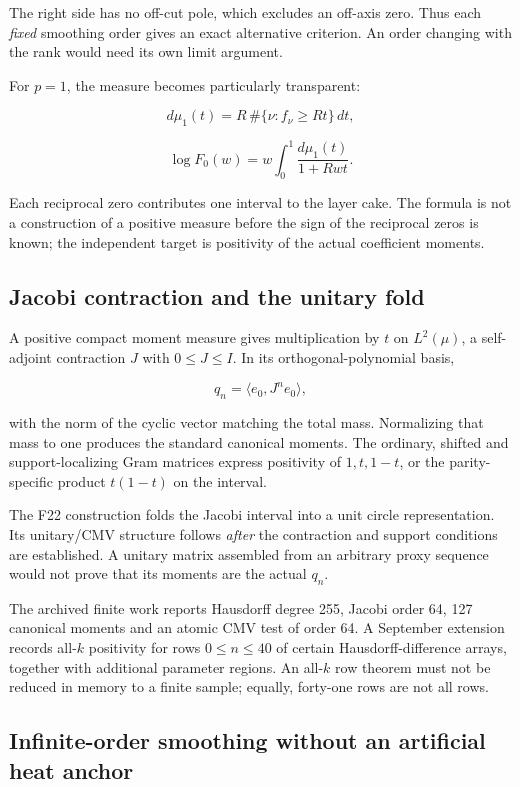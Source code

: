 \documentclass[
  10pt,
  a4paper,
  10pt,
  oneside,
  openany]{book}
\begin{document}
The right side has no off-cut pole, which excludes an off-axis zero.
Thus each \emph{fixed} smoothing order gives an exact alternative
criterion. An order changing with the rank would need its own limit
argument.

For \(p=1\), the measure becomes particularly transparent:

\[
 d\mu_1(t)=R\,\#\{\nu:f_\nu\ge Rt\}\,dt,
\]

\[
 \log F_0(w)=w\int_0^1\frac{d\mu_1(t)}{1+Rwt}.
 \tag{33.3}\label{eq:33.3}
\]

Each reciprocal zero contributes one interval to the layer cake. The
formula is not a construction of a positive measure before the sign of
the reciprocal zeros is known; the independent target is positivity of
the actual coefficient moments.

\subsection{Jacobi contraction and the unitary
fold}\label{jacobi-contraction-and-the-unitary-fold}

A positive compact moment measure gives multiplication by \(t\) on
\(L^2(\mu)\), a self-adjoint contraction \(J\) with \(0\le J\le I\). In
its orthogonal-polynomial basis,

\[
 q_n=\langle e_0,J^ne_0\rangle,
\]

with the norm of the cyclic vector matching the total mass. Normalizing
that mass to one produces the standard canonical moments. The ordinary,
shifted and support-localizing Gram matrices express positivity of
\(1,t,1-t\), or the parity-specific product \(t(1-t)\) on the interval.

The F22 construction folds the Jacobi interval into a unit circle
representation. Its unitary/CMV structure follows \emph{after} the
contraction and support conditions are established. A unitary matrix
assembled from an arbitrary proxy sequence would not prove that its
moments are the actual \(q_n\).

The archived finite work reports Hausdorff degree 255, Jacobi order 64,
127 canonical moments and an atomic CMV test of order 64. A September
extension records all-\(k\) positivity for rows \(0\le n\le40\) of
certain Hausdorff-difference arrays, together with additional parameter
regions. An all-\(k\) row theorem must not be reduced in memory to a
finite sample; equally, forty-one rows are not all rows.

\subsection{Infinite-order smoothing without an artificial heat
anchor}\label{infinite-order-smoothing-without-an-artificial-heat-anchor}
\end{document}
